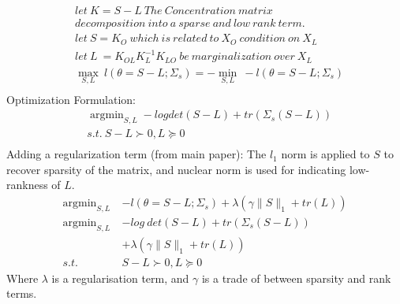 \documentclass[10pt,conference]{IEEEtran}
\DeclareMathOperator*{\argmin}{argmin}
\begin{document}
\begin{align*}
  &let\ K=S-L\ The \ Concentration \ matrix \\
  & decomposition \ into \ a \ sparse \ and \ low \ rank \ term.\\
  &let\ S = K_O \ which\ is\ related\ to\ X_O\ condition\ on \ X_L\\
  &let\ L\ = K_{OL} K_L^{-1} K_{LO} \ be \ marginalization\ over\ X_L\\
  &\max_{S,L}\ l(\theta=S-L; \Sigma_{s}) = -\min_{S,L}\ -l(\theta=S-L; \Sigma_{s})\\
\end{align*}
Optimization Formulation:
\begin{align*}
  &\argmin_{S,L} -log det(S-L) + tr(\Sigma_{s}(S-L))\\
  &s.t.\ S-L \succ 0, L \succeq 0\\
\end{align*}
Adding a regularization term (from main paper):
The $l_1$ norm is applied to $S$ to recover sparsity of the matrix, and nuclear norm is used for indicating low-rankness of $L$.
\begin{align}
  \argmin_{S,L}\ & -l(\theta=S-L; \Sigma_{s}) + \lambda(\gamma \|S\|_1 + tr(L))\nonumber\\
  \argmin_{S,L}\ & -log\ det(S-L) + tr(\Sigma_{s}(S-L))\nonumber\\
                 & + \lambda(\gamma \|S\|_1 + tr(L)) \label{mainpro} \\
  s.t.\ & S-L \succ 0, L \succeq 0 \nonumber
\end{align}
Where $\lambda$ is a regularisation term, and $\gamma$ is a trade of between sparsity and rank terms.
\end{document}
